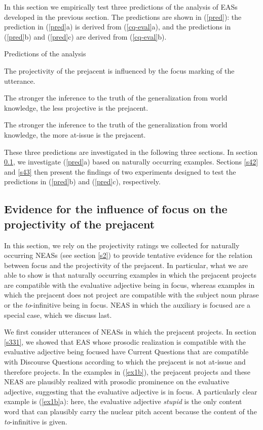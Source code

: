 \documentclass[11pt,fleqn]{article}
\newcommand{\6}{\mbox{$[\hspace*{-.6mm}[$}}
\newcommand{\9}{\mbox{$]\hspace*{-.6mm}]$}}
\begin{document}
In this section we empirically test three predictions of the analysis of EASs developed in the previous section. The predictions are shown in (\ref{pred}): the prediction in (\ref{pred}a) is derived from (\ref{cq-eval}a), and the predictions in (\ref{pred}b) and (\ref{pred}c) are derived from (\ref{cq-eval}b).

\begin{exe}
\ex\label{pred} Predictions of the analysis 

\begin{xlist}

\ex The projectivity of the prejacent is influenced by the focus marking of the utterance.

\ex The stronger the inference to the truth of the generalization from world knowledge, the less projective is the prejacent.

\ex The stronger the inference to the truth of the generalization from world knowledge, the more at-issue is the prejacent.

\end{xlist}
\end{exe}

These three predictions are investigated in the following three sections. In section \ref{s41}, we investigate (\ref{pred}a) based on naturally occurring examples. Sections \ref{s42} and \ref{s43} then present the findings of two experiments designed to test the predictions in (\ref{pred}b) and (\ref{pred}c), respectively.

\subsection{Evidence for the influence of focus on the projectivity of the prejacent}\label{s41}

In this section, we rely on the projectivity ratings we collected for naturally occurring NEASs (see section \ref{s2}) to provide tentative evidence for the relation between focus and the projectivity of the prejacent. In particular, what we are able to show is that naturally occurring examples in which the prejacent projects are compatible with the evaluative adjective being in focus, whereas examples in which the prejacent does not project are compatible with the subject noun phrase or the {\em to}-infinitive being in focus. NEAS in which the auxiliary is focused are a special case, which we discuss last. 

We first consider utterances of NEASs in which the prejacent projects. In section \ref{s331}, we showed that EAS whose prosodic realization is compatible with the evaluative adjective being focused have Current Questions that are compatible with Discourse Questions according to which the prejacent is not at-issue and therefore projects. In the examples in (\ref{ex1b}), the prejacent projects and these NEAS are plausibly realized with prosodic prominence on the evaluative adjective, suggesting that the evaluative adjective is in focus. A particularly clear example is (\ref{ex1b}a): here, the evaluative adjective {\em stupid} is the only content word that can plausibly carry the nuclear pitch accent because the content of the {\em to}-infinitive is given.
\end{document}
